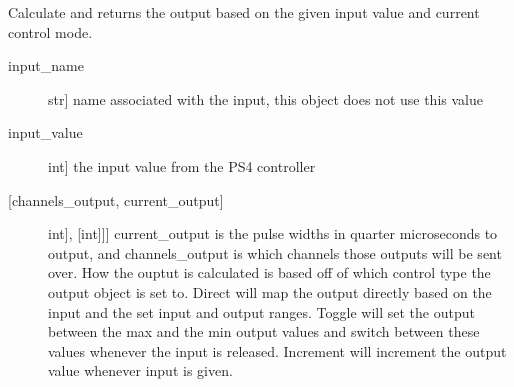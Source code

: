 \documentclass[letterpaper,10pt,english]{sphinxmanual}
\begin{document}
\begin{fulllineitems}
\begin{fulllineitems}
\begin{description}
\end{description}

\end{fulllineitems}


\begin{fulllineitems}
\label{\detokenize{generic:DigitalOutputObject.DigitalOutputObject.get_output}}
\sphinxAtStartPar
Calculate and returns the output based on the given input value and current control mode.

\sphinxAtStartPar
{}
\begin{description}
\item[{input\_name}] \leavevmode{[}str{]}
\sphinxAtStartPar
name associated with the input, this object does not use this value

\item[{input\_value}] \leavevmode{[}int{]}
\sphinxAtStartPar
the input value from the PS4 controller

\end{description}

\sphinxAtStartPar
{}
\begin{description}
\item[{{[}channels\_output, current\_output{]}}] \leavevmode{[}{[}{[}int{]}, {[}int{]}{]}{]}
\sphinxAtStartPar
current\_output is the pulse widths in quarter microseconds to output, and channels\_output
is which channels those outputs will be sent over. How the ouptut is calculated is based
off of which control type the output object is set to. Direct will map the output directly
based on the input and the set input and output ranges. Toggle will set the output between
the max and the min output values and switch between these values whenever the input is
released. Increment will increment the output value whenever input is given.

\end{description}

\end{fulllineitems}



\end{fulllineitems}
\end{document}
